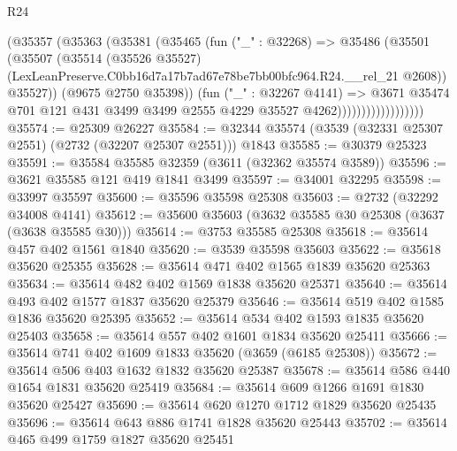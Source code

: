 \begin{lexlean}{R24}
\begin{coremodule}
                              (@35357
                                (@35363
                                  (@35381
                                    (@35465
                                      (fun ("_" : @32268) =>
                                      @35486
                                        (@35501
                                          (@35507
                                            (@35514
                                              (@35526 @35527)
                                              (LexLeanPreserve.C0bb16d7a17b7ad67e78be7bb00bfc964.R24.__rel_21
                                                @2608))
                                            @35527))
                                        (@9675 @2750 @35398))
                                      (fun ("_" : @32267 @4141) =>
                                      @3671
                                        @35474
                                        @701
                                        @121
                                        @431
                                        @3499
                                        @3499
                                        @2555
                                        @4229
                                        @35527
                                        @4262))))))))))))))))))
@35574 := @25309 @26227
@35584 := @32344 @35574 (@3539 (@32331 @25307 @2551) (@2732 (@32207 @25307 @2551))) @1843
@35585 := @30379 @25323
@35591 := @35584 @35585 @32359 (@3611 (@32362 @35574 @3589))
@35596 := @3621 @35585 @121 @419 @1841 @3499
@35597 := @34001 @32295
@35598 := @33997 @35597
@35600 := @35596 @35598 @25308
@35603 := @2732 (@32292 @34008 @4141)
@35612 := @35600 @35603 (@3632 @35585 @30 @25308 (@3637 (@3638 @35585 @30)))
@35614 := @3753 @35585 @25308
@35618 := @35614 @457 @402 @1561 @1840
@35620 := @3539 @35598 @35603
@35622 := @35618 @35620 @25355
@35628 := @35614 @471 @402 @1565 @1839 @35620 @25363
@35634 := @35614 @482 @402 @1569 @1838 @35620 @25371
@35640 := @35614 @493 @402 @1577 @1837 @35620 @25379
@35646 := @35614 @519 @402 @1585 @1836 @35620 @25395
@35652 := @35614 @534 @402 @1593 @1835 @35620 @25403
@35658 := @35614 @557 @402 @1601 @1834 @35620 @25411
@35666 := @35614 @741 @402 @1609 @1833 @35620 (@3659 (@6185 @25308))
@35672 := @35614 @506 @403 @1632 @1832 @35620 @25387
@35678 := @35614 @586 @440 @1654 @1831 @35620 @25419
@35684 := @35614 @609 @1266 @1691 @1830 @35620 @25427
@35690 := @35614 @620 @1270 @1712 @1829 @35620 @25435
@35696 := @35614 @643 @886 @1741 @1828 @35620 @25443
@35702 := @35614 @465 @499 @1759 @1827 @35620 @25451

\end{coremodule}
\end{lexlean}
